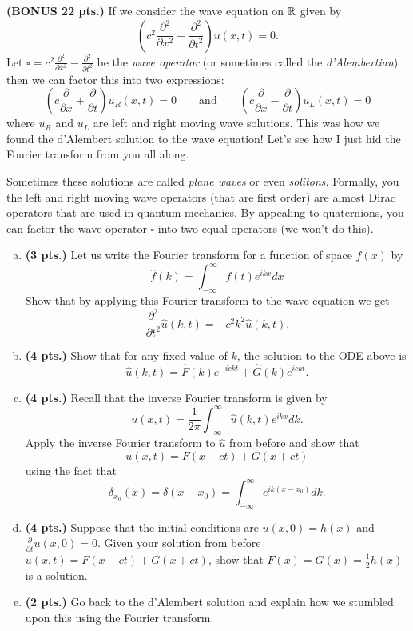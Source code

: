 \documentclass[12pt]{article} %
\begin{document}
\begin{problem}
\textbf{(BONUS 22 pts.)} If we consider the wave equation on $\mathbb{R}$ given by
\[
\left( c^2\frac{\partial^2}{\partial x^2} -\frac{\partial^2}{\partial t^2}\right) u(x,t) = 0.
\]
Let $\square = c^2\frac{\partial^2}{\partial x^2} -\frac{\partial^2}{\partial t^2}$ be the \emph{wave operator} (or sometimes called the \emph{d'Alembertian}) then we can factor this into two expressions:
\[
\left( c\frac{\partial}{\partial x} + \frac{\partial}{\partial t} \right) u_R(x,t) =0 \qquad \textrm{and} \qquad \left( c\frac{\partial}{\partial x} - \frac{\partial}{\partial t} \right) u_L(x,t) =0
\]
where $u_R$ and $u_L$ are left and right moving wave solutions. This was how we found the d'Alembert solution to the wave equation! Let's see how I just hid the Fourier transform from you all along.

Sometimes these solutions are called \emph{plane waves} or even \emph{solitons}. Formally, you the left and right moving wave operators (that are first order) are almost Dirac operators that are used in quantum mechanics. By appealing to quaternions, you can factor the wave operator $\square$ into two equal operators (we won't do this).
\begin{enumerate}[(a)]
\item \textbf{(3 pts.)} Let us write the Fourier transform for a function of space $f(x)$ by
\[
\hat{f}(k) = \int_{-\infty}^\infty f(t) e^{i k x} dx
\]
Show that by applying this Fourier transform to the wave equation we get
\[
\frac{\partial^2}{\partial t^2}\hat{u}(k,t) = -c^2 k^2 \hat{u}(k,t).
\]
\item \textbf{(4 pts.)} Show that for any fixed value of $k$, the solution to the ODE above is
\[
\hat{u}(k,t) = \hat{F}(k)e^{-ickt} + \hat{G}(k)e^{ickt}.
\]
\item \textbf{(4 pts.)} Recall that the inverse Fourier transform is given by
\[
u(x,t) = \frac{1}{2\pi} \int_{-\infty}^\infty \hat{u}(k,t) e^{ikx} dk.
\]
Apply the inverse Fourier transform to $\hat{u}$ from before and show that
\[
u(x,t) = F(x-ct) + G(x+ct)
\]
using the fact that
\[
\delta_{x_0}(x) = \delta(x-x_0) = \int_{-\infty}^\infty  e^{ik(x-x_0)} dk.
\]

\item \textbf{(4 pts.)} Suppose that the initial conditions are $u(x,0) = h(x)$ and $\frac{\partial}{\partial t} u(x,0) = 0$. Given your solution from before $u(x,t)=F(x-ct)+G(x+ct)$, show that $F(x)=G(x)=\frac{1}{2}h(x)$ is a solution.

\item \textbf{(2 pts.)} Go back to the d'Alembert solution and explain how we stumbled upon this using the Fourier transform.


\end{enumerate}
\end{problem}
\end{document}
